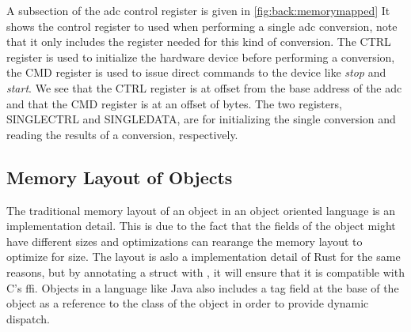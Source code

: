 A subsection of the \gls{adc} control register is given in \autoref{fig:back:memorymapped}
It shows the control register to used when performing a single \gls{adc} conversion, note that it only includes the register needed for this kind of conversion.
The CTRL register is used to initialize the hardware device before performing a conversion, the CMD register is used to issue direct commands to the device like \emph{stop} and \emph{start}.
We see that the CTRL register is at offset  from the base address of the \gls{adc} and that the CMD register is at an offset of  bytes.
The two registers, SINGLECTRL and SINGLEDATA, are for initializing the single conversion and reading the results of a conversion, respectively.

\subsection{Memory Layout of Objects}

The traditional memory layout of an object in an object oriented language is an implementation detail.
This is due to the fact that the fields of the object might have different sizes and optimizations can rearange the memory layout to optimize for size.
The layout is aslo a implementation detail of Rust for the same reasons, but by annotating a struct with \attrib{\#[repr(C)]}, it will ensure that it is compatible with C's \gls{ffi}.
Objects in a language like Java also includes a tag field at the base of the object as a reference to the class of the object in order to provide dynamic dispatch.

